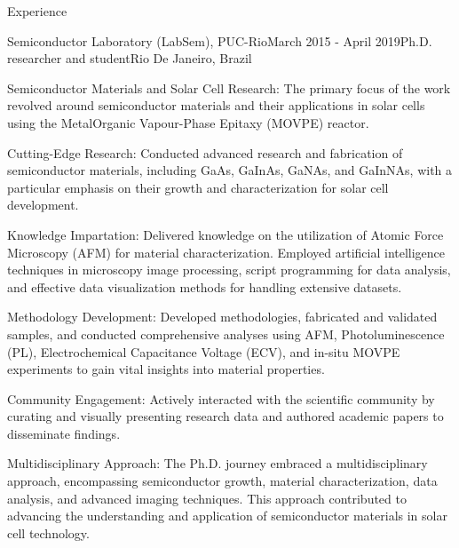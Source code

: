 \documentclass{resume} %
\begin{document}
\begin{rSection}{Experience}
        \begin{rSubsection}{Semiconductor Laboratory (LabSem), PUC-Rio}{March  2015 - April 2019}{Ph.D. researcher and student}{Rio De Janeiro, Brazil}
            {\normalfont 
            \item Semiconductor Materials and Solar Cell Research: The primary focus of the work revolved around semiconductor materials and their applications in solar cells using the MetalOrganic Vapour-Phase Epitaxy (MOVPE) reactor.
            \item Cutting-Edge Research: Conducted advanced research and fabrication of semiconductor materials, including GaAs, GaInAs, GaNAs, and GaInNAs, with a particular emphasis on their growth and characterization for solar cell development.
            \item Knowledge Impartation: Delivered knowledge on the utilization of Atomic Force Microscopy (AFM) for material characterization. Employed artificial intelligence techniques in microscopy image processing, script programming for data analysis, and effective data visualization methods for handling extensive datasets.
            \item Methodology Development: Developed methodologies, fabricated and validated samples, and conducted comprehensive analyses using AFM, Photoluminescence (PL), Electrochemical Capacitance Voltage (ECV), and in-situ MOVPE experiments to gain vital insights into material properties.
            \item Community Engagement: Actively interacted with the scientific community by curating and visually presenting research data and authored academic papers to disseminate findings.
            \item Multidisciplinary Approach: The Ph.D. journey embraced a multidisciplinary approach, encompassing semiconductor growth, material characterization, data analysis, and advanced imaging techniques. This approach contributed to advancing the understanding and application of semiconductor materials in solar cell technology.
            }
        \end{rSubsection}


\end{rSection}
\end{document}
